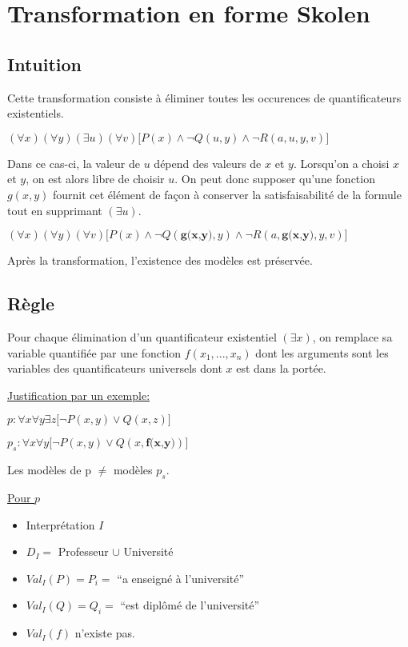\section{Transformation en forme Skolen}
\subsection{Intuition}

Cette transformation consiste à éliminer toutes les occurences de quantificateurs existentiels.
\smallskip

$(\forall x)(\forall y)(\exists u)(\forall v) \big[ P(x) \wedge \neg Q(u,y) \wedge \neg R(a,u,y,v) \big]$
\smallskip 


Dans ce cas-ci, la valeur de $u$ dépend des valeurs de $x$ et $y$. Lorsqu'on a choisi $x$ et $y$, on est alors libre de choisir $u$.
On peut donc supposer qu'une fonction $g(x,y)$ fournit cet élément de façon à conserver la satisfaisabilité de la formule tout en supprimant $(\exists u)$.
\smallskip

$(\forall x)(\forall y)(\forall v) \big[ P(x) \wedge \neg Q(\textbf{g(x,y)},y) \wedge \neg R(a,\textbf{g(x,y)},y,v) \big]$
\smallskip

Après la transformation, l'existence des modèles est préservée.

\subsection{Règle}

Pour chaque élimination d'un quantificateur existentiel $(\exists x)$, on remplace sa variable quantifiée par une fonction $f(x_1,...,x_n)$ dont les arguments sont les variables des quantificateurs universels dont $x$ est dans la portée.
\smallskip

\underline{Justification par un exemple:}

$p: \forall x \forall y \exists z \big[ \neg P(x,y) \vee Q(x,z) \big]$
\smallskip

$p_s: \forall x \forall y \big[ \neg P(x,y) \vee Q(x,\textbf{f(x,y)}) \big]$
\smallskip

Les modèles de p $\neq$ modèles $p_s$.

\underline{Pour $p$}
\begin{itemize}
  \item Interprétation $I$
  \item $D_I =$ Professeur $\cup$ Université
  \item $Val_I(P) = P_i = $ ``a enseigné à l'université''
  \item $Val_I(Q) = Q_i = $ ``est diplômé de l'université''
  \item $Val_I(f)$ n'existe pas.
\end{itemize}


